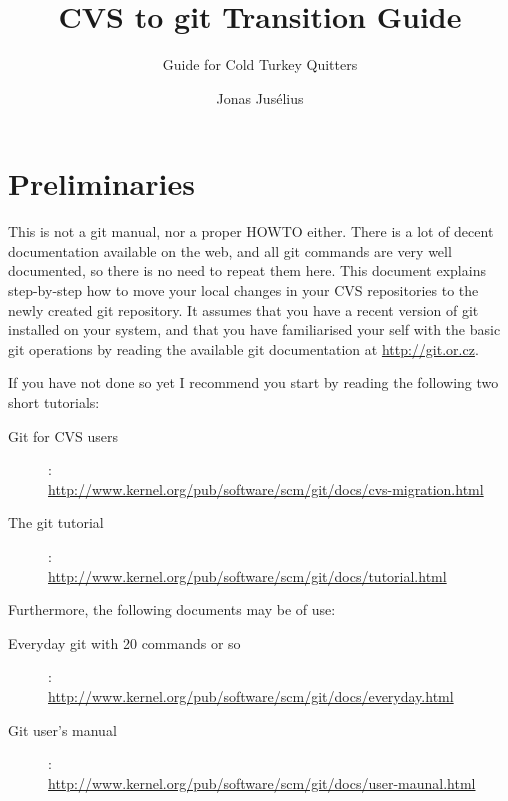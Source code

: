 \documentclass[a4paper,10pt]{article}
\begin{document}
\pagestyle{fancy}
\fancyfoot{}
\fancyhead{}
\renewcommand{\sectionmark}[1]{\markboth{\sf\thesection.\ #1}{}}
\renewcommand{\subsectionmark}[1]{}
\fancyhead[R]{{\rmfamily\thepage}}

\title{CVS to git Transition Guide}

\subtitle{Guide for Cold Turkey Quitters}
\author{{\sf Jonas Jus\'elius}}
\address{
{\sf University of Tromsø}\\
{\sf Department of Chemistry}\\
{\sf N-9037 University of Tromsø, Norway}
}

\maketitle

\section{Preliminaries}
This is not a git manual, nor a proper HOWTO either. There is a lot of decent
documentation available on the web, and all git commands are very well
documented, so there is no need to repeat them here. 
This document explains step-by-step how to move your local changes
in your CVS repositories to the newly created git repository. It assumes that
you have a recent version of git installed on your system, and that you have
familiarised your self with the basic git operations by reading the available
git documentation at \url{http://git.or.cz}. 


If you have not done so yet I
recommend you start by reading the following two short tutorials:
\begin{description}
\item[Git for CVS users]:\\
\url{http://www.kernel.org/pub/software/scm/git/docs/cvs-migration.html}
\item[The git tutorial]:\\
\url{http://www.kernel.org/pub/software/scm/git/docs/tutorial.html}
\end{description}
Furthermore, the following documents may be of use:
\begin{description}
\item[Everyday git with 20 commands or so]:\\
\url{http://www.kernel.org/pub/software/scm/git/docs/everyday.html}
\item[Git user's manual]:\\
\url{http://www.kernel.org/pub/software/scm/git/docs/user-maunal.html}
\end{description}
\end{document}
